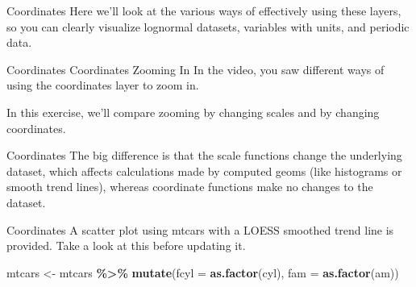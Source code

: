 \documentclass[
  ignorenonframetext,
]{beamer}
\newenvironment{Shaded}{\begin{snugshade}}{\end{snugshade}}
\newcommand{\AttributeTok}[1]{\textcolor[rgb]{0.13,0.29,0.53}{#1}}
\newcommand{\FunctionTok}[1]{\textcolor[rgb]{0.13,0.29,0.53}{\textbf{#1}}}
\newcommand{\NormalTok}[1]{#1}
\newcommand{\OtherTok}[1]{\textcolor[rgb]{0.56,0.35,0.01}{#1}}
\newcommand{\SpecialCharTok}[1]{\textcolor[rgb]{0.81,0.36,0.00}{\textbf{#1}}}
\begin{document}
\begin{frame}{Coordinates}
\label{coordinates-2}
Here we'll look at the various ways of effectively using these layers,
so you can clearly visualize lognormal datasets, variables with units,
and periodic data.
\end{frame}

\begin{frame}{Coordinates}
\label{coordinates-3}
Coordinates Zooming In In the video, you saw different ways of using the
coordinates layer to zoom in.

In this exercise, we'll compare zooming by changing scales and by
changing coordinates.
\end{frame}

\begin{frame}{Coordinates}
\label{coordinates-4}
The big difference is that the scale functions change the underlying
dataset, which affects calculations made by computed geoms (like
histograms or smooth trend lines), whereas coordinate functions make no
changes to the dataset.
\end{frame}

\begin{frame}[fragile]{Coordinates}
\label{coordinates-5}
A scatter plot using mtcars with a LOESS smoothed trend line is
provided. Take a look at this before updating it.


\begin{Shaded}
\begin{Highlighting}[]
\NormalTok{mtcars }\OtherTok{\textless{}{-}}\NormalTok{ mtcars }\SpecialCharTok{\%\textgreater{}\%}
    \FunctionTok{mutate}\NormalTok{(}\AttributeTok{fcyl =} \FunctionTok{as.factor}\NormalTok{(cyl), }\AttributeTok{fam =} \FunctionTok{as.factor}\NormalTok{(am))}
\end{Highlighting}
\end{Shaded}
\end{frame}
\end{document}
